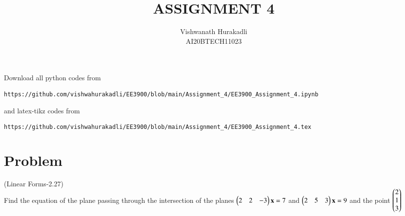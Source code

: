 \documentclass[journal,12pt,twocolumn]{IEEEtran}
\begin{document}
     \def\centbox#1{\makebox[0in]{#1}}
     \def\topbox#1{\raisebox{-\baselineskip}[0in][0in]{#1}}
     \def\midbox#1{\raisebox{-0.5\baselineskip}[0in][0in]{#1}}
\vspace{3cm}
\title{ASSIGNMENT 4}
\author{Vishwanath Hurakadli\\ AI20BTECH11023}
\maketitle
\newpage
\bigskip
\renewcommand{\thefigure}{\theenumi}
\renewcommand{\thetable}{\theenumi}
Download all python codes from
\begin{lstlisting}
https://github.com/vishwahurakadli/EE3900/blob/main/Assignment_4/EE3900_Assignment_4.ipynb
\end{lstlisting} 
and latex-tikz codes from 
\begin{lstlisting}
https://github.com/vishwahurakadli/EE3900/blob/main/Assignment_4/EE3900_Assignment_4.tex
\end{lstlisting}
%
\section{Problem}
(Linear Forms-2.27)\\
Find the equation of the plane passing through the intersection of the planes $\begin{pmatrix}2&2&-3\end{pmatrix}\mathbf{x} = 7$ and $\begin{pmatrix}2&5&3\end{pmatrix}\mathbf{x} = 9$ and the point $\begin{pmatrix}2\\1\\3\end{pmatrix}$
\end{document}
